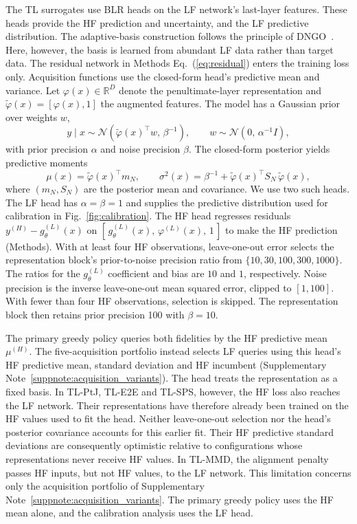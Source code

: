 The TL surrogates use BLR heads on the LF network's last-layer features. These heads provide the HF prediction and uncertainty, and the LF predictive distribution. The adaptive-basis construction follows the principle of DNGO~\citep{snoek2015scalable}. Here, however, the basis is learned from abundant LF data rather than target data. The residual network in Methods Eq.~(\ref{eq:residual}) enters the training loss only. Acquisition functions use the closed-form head's predictive mean and variance. Let $\varphi(x) \in \mathbb{R}^D$ denote the penultimate-layer representation and $\tilde{\varphi}(x) = [\varphi(x), 1]$ the augmented features. The model has a Gaussian prior over weights $w$,
\begin{equation}
y \mid x \sim \mathcal{N}\!\left(\tilde{\varphi}(x)^\top w,\, \beta^{-1}\right), \qquad w \sim \mathcal{N}\!\left(0,\, \alpha^{-1} I\right),
\end{equation}
with prior precision $\alpha$ and noise precision $\beta$. The closed-form posterior
yields predictive moments
\begin{equation}
\mu(x) = \tilde{\varphi}(x)^\top m_N, \qquad \sigma^2(x) = \beta^{-1} + \tilde{\varphi}(x)^\top S_N\, \tilde{\varphi}(x),
\end{equation}
where $(m_N, S_N)$ are the posterior mean and covariance. We use two such heads. The LF head has $\alpha = \beta = 1$ and supplies the predictive distribution used for calibration in Fig.~\ref{fig:calibration}. The HF head regresses residuals $y^{(H)} - g^{(L)}_{\theta}(x)$ on $[\,g^{(L)}_{\theta}(x),\, \varphi^{(L)}(x),\, 1\,]$ to make the HF prediction (Methods). With at least four HF observations, leave-one-out error selects the representation block's prior-to-noise precision ratio from $\{10, 30, 100, 300, 1000\}$. The ratios for the $g^{(L)}_{\theta}$ coefficient and bias are $10$ and $1$, respectively. Noise precision is the inverse leave-one-out mean squared error, clipped to $[1, 100]$. With fewer than four HF observations, selection is skipped. The representation block then retains prior precision 100 with $\beta = 10$.

The primary greedy policy queries both fidelities by the HF predictive mean $\mu^{(H)}$. The five-acquisition portfolio instead selects LF queries using this head's HF predictive mean, standard deviation and HF incumbent (Supplementary Note~\ref{suppnote:acquisition_variants}). The head treats the representation as a fixed basis. In TL-PtJ, TL-E2E and TL-SPS, however, the HF loss also reaches the LF network. Their representations have therefore already been trained on the HF values used to fit the head. Neither leave-one-out selection nor the head's posterior covariance accounts for this earlier fit. Their HF predictive standard deviations are consequently optimistic relative to configurations whose representations never receive HF values. In TL-MMD, the alignment penalty passes HF inputs, but not HF values, to the LF network. This limitation concerns only the acquisition portfolio of Supplementary Note~\ref{suppnote:acquisition_variants}. The primary greedy policy uses the HF mean alone, and the calibration analysis uses the LF head.


